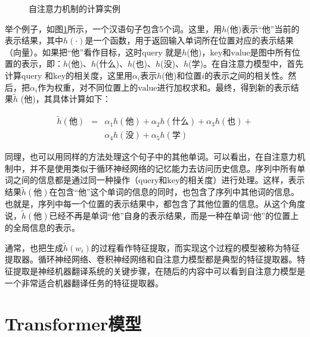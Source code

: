 \begin{figure}[htp]
\centering

\caption{自注意力机制的计算实例}
\label{fig:12-3}
\end{figure}

\parinterval 举个例子，如图\ref{fig:12-3}所示，一个汉语句子包含5个词。这里，用$h$(他)表示“他”当前的表示结果，其中$h(\cdot)$是一个函数，用于返回输入单词所在位置对应的表示结果（向量）。如果把“他”看作目标，这时$\mathrm{query}$ 就是$h$(他)，$\mathrm{key}$和$\mathrm{value}$是图中所有位置的表示，即：{$h$(他)、$h$(什么)、$h$(也)、$h$(没)、$h$(学)}。在自注意力模型中，首先计算$\mathrm{query}$ 和$\mathrm{key}$的相关度，这里用$\alpha_i$表示$h$(他)和位置$i$的表示之间的相关性。然后，把$\alpha_i$作为权重，对不同位置上的$\mathrm{value}$进行加权求和。最终，得到新的表示结果$\tilde{h}$ (他)，其具体计算如下：

\begin{eqnarray}
\tilde{h} (\textrm{他} ) & = & \alpha_1 {h} (\textrm{他} ) + \alpha_2 {h} (\textrm{什么}) + \alpha_3 {h} (\textrm{也} ) + \nonumber \\
                         &   & \alpha_4 {h} (\textrm{没} ) +\alpha_5 {h} (\textrm{学} )
\label{eq:12-2}
\end{eqnarray}


\parinterval 同理，也可以用同样的方法处理这个句子中的其他单词。可以看出，在自注意力机制中，并不是使用类似于循环神经网络的记忆能力去访问历史信息。序列中所有单词之间的信息都是通过同一种操作（$\mathrm{query}$和$\mathrm{key}$的相关度）进行处理。这样，表示结果$\tilde{h} (\textrm{他})$在包含“他”这个单词的信息的同时，也包含了序列中其他词的信息。也就是，序列中每一个位置的表示结果中，都包含了其他位置的信息。从这个角度说，$\tilde{h} (\textrm{他})$已经不再是单词“他”自身的表示结果，而是一种在单词“他”的位置上的全局信息的表示。

\parinterval 通常，也把生成$\tilde{h}(w_i)$的过程看作特征提取，而实现这个过程的模型被称为特征提取器。循环神经网络、卷积神经网络和自注意力模型都是典型的特征提取器。特征提取是神经机器翻译系统的关键步骤，在随后的内容中可以看到自注意力模型是一个非常适合机器翻译任务的特征提取器。

\sectionnewpage
\section{Transformer模型}

